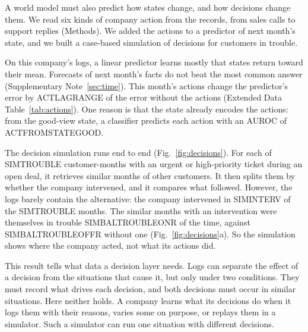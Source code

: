 \documentclass[11pt]{article}
\begin{document}
A world model must also predict how states change, and how decisions change them. We read six kinds of company action from the records, from sales calls to support replies (Methods). We added the actions to a predictor of next month's state, and we built a case-based simulation of decisions for customers in trouble.

On this company's logs, a linear predictor learns mostly that states return toward their mean. Forecasts of next month's facts do not beat the most common answer (Supplementary Note~\ref{sec:time}). This month's actions change the predictor's error by ACTLAGRANGE of the error without the actions (Extended Data Table~\ref{tab:actions}). One reason is that the state already encodes the actions: from the good-view state, a classifier predicts each action with an AUROC of ACTFROMSTATEGOOD.

The decision simulation runs end to end (Fig.~\ref{fig:decisions}). For each of SIMTROUBLE customer-months with an urgent or high-priority ticket during an open deal, it retrieves similar months of other customers. It then splits them by whether the company intervened, and it compares what followed. However, the logs barely contain the alternative: the company intervened in SIMINTERV of the SIMTROUBLE months. The similar months with an intervention were themselves in trouble SIMBALTROUBLEONR of the time, against SIMBALTROUBLEOFFR without one (Fig.~\ref{fig:decisions}a). So the simulation shows where the company acted, not what its actions did.

This result tells what data a decision layer needs. Logs can separate the effect of a decision from the situations that cause it, but only under two conditions\citep{pearl2009causality,hernan2020causal}. They must record what drives each decision, and both decisions must occur in similar situations. Here neither holds. A company learns what its decisions do when it logs them with their reasons, varies some on purpose, or replays them in a simulator. Such a simulator can run one situation with different decisions.
\end{document}
